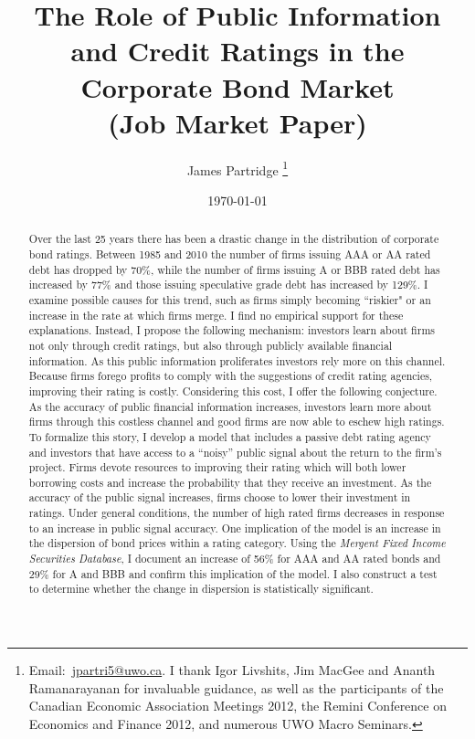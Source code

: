 \documentclass[titlepage]{article}
\title{The Role of Public Information and Credit Ratings in the Corporate Bond Market\\(Job Market Paper)}
\author{James Partridge%
\thanks{Email:~\href{mailto:jpartri5@uwo.ca}{jpartri5@uwo.ca}. I thank Igor Livshits, Jim MacGee and Ananth Ramanarayanan for invaluable guidance, as well as the participants of the Canadian Economic Association Meetings 2012, the Remini Conference on Economics and Finance 2012, and numerous UWO Macro Seminars.}}
\affil{The University of Western Ontario}
\date{\today}
\begin{document}
\maketitle

\begin{abstract}
Over the last 25 years there has been a drastic change in the distribution of corporate bond ratings. Between 1985 and 2010 the number of firms issuing AAA or AA rated debt has dropped by 70\%, while the number of firms issuing A or BBB rated debt has increased by 77\% and those issuing speculative grade debt has increased by 129\%. I examine possible causes for this trend, such as firms simply becoming ``riskier" or an increase in the rate at which firms merge. I find no empirical support for these explanations. Instead, I propose the following mechanism: investors learn about firms not only through credit ratings, but also through publicly available financial information. As this public information proliferates investors rely more on this channel. Because firms forego profits to comply with the suggestions of credit rating agencies, improving their rating is costly. Considering this cost, I offer the following conjecture. As the accuracy of public financial information increases, investors learn more about firms through this costless channel and good firms are now able to eschew high ratings. To formalize this story, I develop a model that includes a passive debt rating agency and investors that have access to a ``noisy'' public signal about the return to the firm's project. Firms devote resources to improving their rating which will both lower borrowing costs and increase the probability that they receive an investment.  As the accuracy of the public signal increases, firms choose to lower their investment in ratings. Under general conditions, the number of high rated firms decreases in response to an increase in public signal accuracy. One implication of the model is an increase in the dispersion of bond prices within a rating category. Using the \textit{Mergent Fixed Income Securities Database}, I document an increase of 56\% for AAA and AA rated bonds and 29\% for A and BBB and confirm this implication of the model. I also construct a test to determine whether the change in dispersion is statistically significant.
\end{abstract}

\clearpage
\end{document}
